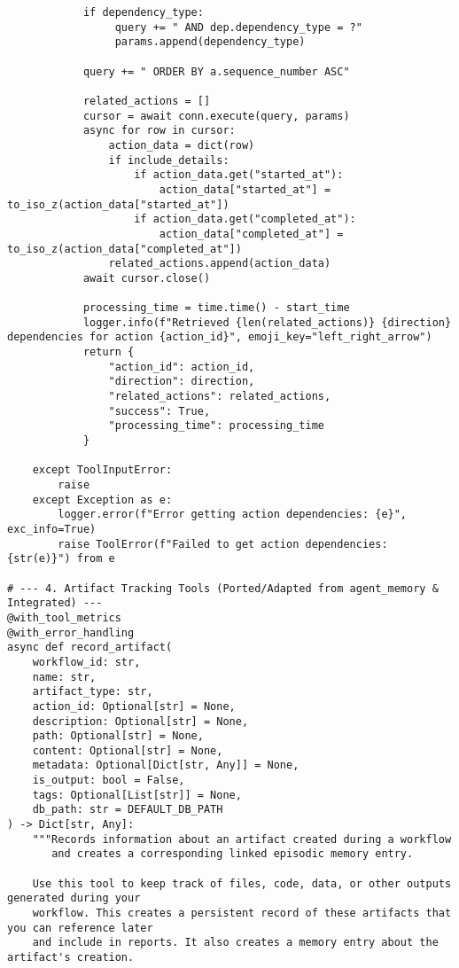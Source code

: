 \documentclass[12pt,a4paper]{article}
\begin{document}
\begin{pageablecode}
\begin{verbatim}
            if dependency_type:
                 query += " AND dep.dependency_type = ?"
                 params.append(dependency_type)

            query += " ORDER BY a.sequence_number ASC"

            related_actions = []
            cursor = await conn.execute(query, params)
            async for row in cursor:
                action_data = dict(row)
                if include_details:
                    if action_data.get("started_at"):
                        action_data["started_at"] = to_iso_z(action_data["started_at"])
                    if action_data.get("completed_at"):
                        action_data["completed_at"] = to_iso_z(action_data["completed_at"])
                related_actions.append(action_data)
            await cursor.close()

            processing_time = time.time() - start_time
            logger.info(f"Retrieved {len(related_actions)} {direction} dependencies for action {action_id}", emoji_key="left_right_arrow")
            return {
                "action_id": action_id,
                "direction": direction,
                "related_actions": related_actions,
                "success": True,
                "processing_time": processing_time
            }

    except ToolInputError:
        raise
    except Exception as e:
        logger.error(f"Error getting action dependencies: {e}", exc_info=True)
        raise ToolError(f"Failed to get action dependencies: {str(e)}") from e

# --- 4. Artifact Tracking Tools (Ported/Adapted from agent_memory & Integrated) ---
@with_tool_metrics
@with_error_handling
async def record_artifact(
    workflow_id: str,
    name: str,
    artifact_type: str,
    action_id: Optional[str] = None,
    description: Optional[str] = None,
    path: Optional[str] = None,
    content: Optional[str] = None,
    metadata: Optional[Dict[str, Any]] = None,
    is_output: bool = False,
    tags: Optional[List[str]] = None,
    db_path: str = DEFAULT_DB_PATH
) -> Dict[str, Any]:
    """Records information about an artifact created during a workflow
       and creates a corresponding linked episodic memory entry.

    Use this tool to keep track of files, code, data, or other outputs generated during your
    workflow. This creates a persistent record of these artifacts that you can reference later
    and include in reports. It also creates a memory entry about the artifact's creation.


\end{verbatim}
\end{pageablecode}
\end{document}
